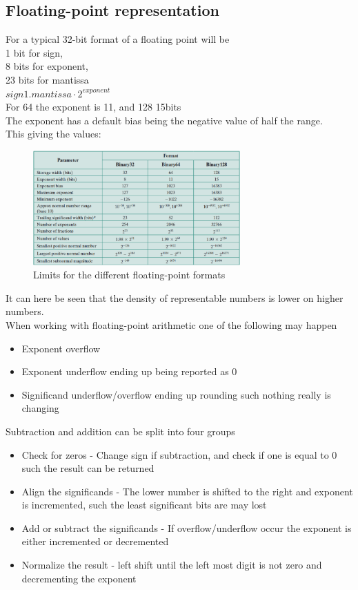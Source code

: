 \documentclass[12pt, a4paper]{article}
\begin{document}
		\subsection{Floating-point representation}
			For a typical 32-bit format of a floating point will be\\
			1 bit for sign,\\
			8 bits for exponent,\\
			23 bits for mantissa\\
			$sign 1.mantissa\cdot 2^{exponent}$\\
			For 64 the exponent is 11, and 128 15bits\\
			The exponent has a default bias being the negative value of half the range.\\
			This giving the values:
			\begin{figure}[h!]
				\includegraphics[width=300px]{assets/floatingPointLimits.png}
				\caption{Limits for the different floating-point formats}
				\centering
			\end{figure}
			It can here be seen that the density of representable numbers is lower on higher numbers.\\
			When working with floating-point arithmetic one of the following may happen
			\begin{itemize}
				\item Exponent overflow
				\item Exponent underflow ending up being reported as 0
				\item Significand underflow/overflow ending up rounding such nothing really is changing
			\end{itemize}
			Subtraction and addition can be split into four groups
			\begin{itemize}
				\item Check for zeros - Change sign if subtraction, and check if one is equal to 0 such the result can be returned
				\item Align the significands - The lower number is shifted to the right and exponent is incremented, such the least significant bits are may lost
				\item Add or subtract the significands - If overflow/underflow occur the exponent is either incremented or decremented
				\item Normalize the result - left shift until the left most digit is not zero and decrementing the exponent
			\end{itemize}
\end{document}
